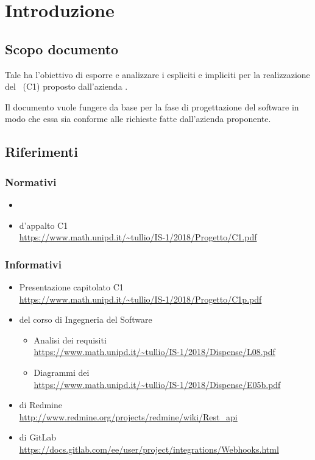 \newpage
\section{Introduzione}

	\subsection{Scopo documento}
	Tale  ha l'obiettivo di esporre e analizzare i  espliciti e impliciti per la realizzazione del  \progetto\ (C1) proposto dall'azienda \II.

	Il documento vuole fungere da base per la fase di progettazione del software in modo che essa sia conforme alle richieste fatte dall'azienda proponente.

    

    

	\subsection{Riferimenti}

	\subsubsection{Normativi}
	\begin{itemize}
		\item \Doc{\NdPv}
		\item {} d'appalto C1\\
		\url{https://www.math.unipd.it/~tullio/IS-1/2018/Progetto/C1.pdf}
	\end{itemize}

	\subsubsection{Informativi} \label{sec:RiferimentiInformativi}
	\begin{itemize}
		\item Presentazione capitolato C1\\
		\url{https://www.math.unipd.it/~tullio/IS-1/2018/Progetto/C1p.pdf}
		\item {} del corso di Ingegneria del Software
		\begin{itemize}
			\item Analisi dei requisiti\\
			\url{https://www.math.unipd.it/~tullio/IS-1/2018/Dispense/L08.pdf}
			\item Diagrammi dei \\
			\url{https://www.math.unipd.it/~tullio/IS-1/2018/Dispense/E05b.pdf}
		\end{itemize}
		\item {} di Redmine\\
		\url{http://www.redmine.org/projects/redmine/wiki/Rest_api}
		\item {} di GitLab\\
		\url{https://docs.gitlab.com/ee/user/project/integrations/Webhooks.html}
	\end{itemize}